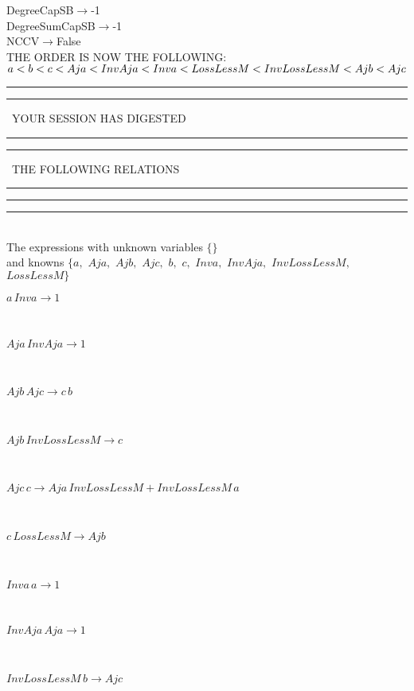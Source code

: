 DegreeCapSB$\rightarrow $-1\\
DegreeSumCapSB$\rightarrow $-1\\
NCCV$\rightarrow $False\\
THE ORDER IS NOW THE FOLLOWING:\hfil\break
$
a<b<c<Aja<InvAja<Inva<LossLessM<InvLossLessM<Ajb<Ajc\\
$
\rule[2pt]{6in}{4pt}\hfil\break
\rule[2pt]{1.879in}{4pt}
\ YOUR SESSION HAS DIGESTED\ 
\rule[2pt]{1.879in}{4pt}\hfil\break
\rule[2pt]{1.923in}{4pt}
\ THE FOLLOWING RELATIONS\ 
\rule[2pt]{1.923in}{4pt}\hfil\break
\rule[2pt]{6in}{4pt}\hfil\break
\rule[3pt]{6in}{.7pt}\\
The expressions with unknown variables $\{\}$\\
and knowns $\{a,
$ $
Aja,
$ $
Ajb,
$ $
Ajc,
$ $
b,
$ $
c,
$ $
Inva,
$ $
InvAja,
$ $
InvLossLessM,
$ $
LossLessM\}$\smallskip\\
\begin{minipage}{6in}
$
a\,
 Inva\rightarrow 1
$
\end{minipage}\medskip \\
\begin{minipage}{6in}
$
Aja\,
 InvAja\rightarrow 1
$
\end{minipage}\medskip \\
\begin{minipage}{6in}
$
Ajb\,
 Ajc\rightarrow c\,
 b
$
\end{minipage}\medskip \\
\begin{minipage}{6in}
$
Ajb\,
 InvLossLessM\rightarrow c
$
\end{minipage}\medskip \\
\begin{minipage}{6in}
$
Ajc\,
 c\rightarrow Aja\,
 InvLossLessM + InvLossLessM\,
 a
$
\end{minipage}\medskip \\
\begin{minipage}{6in}
$
c\,
 LossLessM\rightarrow Ajb
$
\end{minipage}\medskip \\
\begin{minipage}{6in}
$
Inva\,
 a\rightarrow 1
$
\end{minipage}\medskip \\
\begin{minipage}{6in}
$
InvAja\,
 Aja\rightarrow 1
$
\end{minipage}\medskip \\
\begin{minipage}{6in}
$
InvLossLessM\,
 b\rightarrow Ajc
$
\end{minipage}\medskip \\
